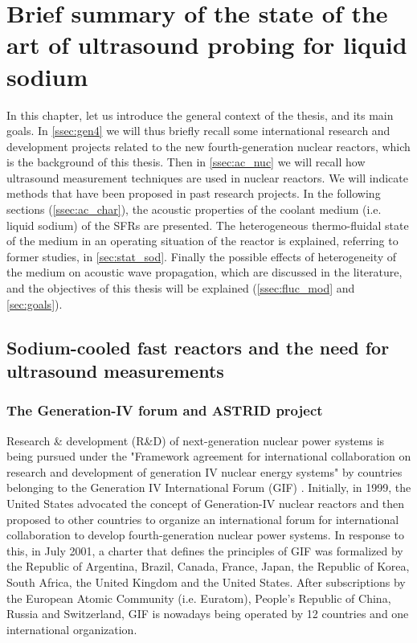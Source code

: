 
\chapter{Brief summary of the state of the art of ultrasound probing for liquid sodium}

In this chapter, let us introduce the general context of the thesis, and its main goals.
In \autoref{ssec:gen4} we will thus briefly recall some international research and development projects related to the new fourth-generation nuclear
reactors, which is the background of this thesis. Then in \autoref{ssec:ac_nuc} we will recall how ultrasound measurement techniques are
used in nuclear reactors. We will indicate methods that have been proposed in past research projects. In the following sections (\autoref{ssec:ac_char}), the acoustic
properties of the coolant medium (i.e. liquid sodium) of the SFRs are presented. The heterogeneous thermo-fluidal state of the medium in an operating
situation of the reactor is explained, referring to former studies, in \autoref{sec:stat_sod}. Finally the possible effects of heterogeneity of the medium
on acoustic wave propagation, which are discussed in the literature, and the objectives of this thesis will be explained (\autoref{ssec:fluc_mod} and \autoref{sec:goals}).

\section{Sodium-cooled fast reactors and the need for ultrasound measurements}

\subsection{The Generation-IV forum and ASTRID project} \label{ssec:gen4}

    Research \& development (R\&D) of next-generation nuclear power systems is being pursued under the "Framework agreement for international collaboration on
research and development of generation IV nuclear energy systems" by countries belonging to the Generation IV International Forum (GIF)
\citet{GIF2005Frameworkagreementfor}. Initially, in 1999, the United States advocated the concept of Generation-IV nuclear reactors and then proposed to other
countries to organize an international forum for international collaboration to develop fourth-generation nuclear power systems. In response to this, in July
2001, a charter that defines the principles of GIF was formalized by the Republic of Argentina, Brazil, Canada, France, Japan, the Republic of Korea, South
Africa, the United Kingdom and the United States. After subscriptions by the European Atomic Community (i.e. Euratom), People's Republic of China, Russia and
Switzerland, GIF is nowadays being operated by 12 countries and one international organization.

